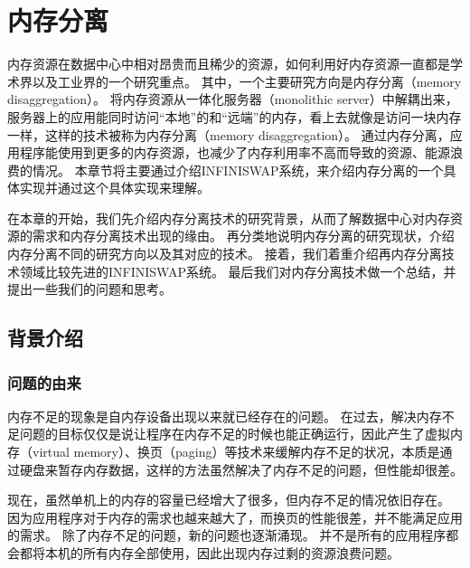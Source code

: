 
\chapter{内存分离} %

\label{Chapter2} %

%

内存资源在数据中心中相对昂贵而且稀少的资源，如何利用好内存资源一直都是学术界以及工业界的一个研究重点。
其中，一个主要研究方向是内存分离（memory disaggregation）。
将内存资源从一体化服务器（monolithic server）中解耦出来，服务器上的应用能同时访问“本地”的和“远端”的内存，看上去就像是访问一块内存一样，这样的技术被称为内存分离（memory disaggregation）。
通过内存分离，应用程序能使用到更多的内存资源，也减少了内存利用率不高而导致的资源、能源浪费的情况。
本章节将主要通过介绍INFINISWAP系统，来介绍内存分离的一个具体实现并通过这个具体实现来理解。

在本章的开始，我们先介绍内存分离技术的研究背景，从而了解数据中心对内存资源的需求和内存分离技术出现的缘由。
再分类地说明内存分离的研究现状，介绍内存分离不同的研究方向以及其对应的技术。
接着，我们着重介绍再内存分离技术领域比较先进的INFINISWAP系统。
最后我们对内存分离技术做一个总结，并提出一些我们的问题和思考。


\section{背景介绍}

\subsection{问题的由来}
内存不足的现象是自内存设备出现以来就已经存在的问题。
在过去，解决内存不足问题的目标仅仅是说让程序在内存不足的时候也能正确运行，因此产生了虚拟内存（virtual memory）、换页（paging）等技术来缓解内存不足的状况，本质是通过硬盘来暂存内存数据，这样的方法虽然解决了内存不足的问题，但性能却很差。

现在，虽然单机上的内存的容量已经增大了很多，但内存不足的情况依旧存在。
因为应用程序对于内存的需求也越来越大了，而换页的性能很差，并不能满足应用的需求。
除了内存不足的问题，新的问题也逐渐涌现。
并不是所有的应用程序都会都将本机的所有内存全部使用，因此出现内存过剩的资源浪费问题。

